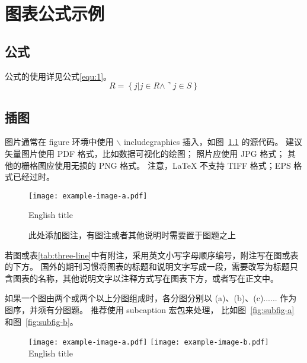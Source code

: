 
\chapter{图表公式示例}
\section{公式}
公式的使用详见公式\eqref{equ:1}。
\begin{equation}
    R = \left\{ j | j \in  R \wedge \urcorner j \in S  \right\}
    \label{equ:1} %
\end{equation}

\section{插图}

图片通常在 figure 环境中使用\cite{dupont1974bone}\cite{jianduju1994}  $\backslash$ includegraphics 插入，如图~\ref{fig:example} 的源代码。
建议矢量图片使用 PDF 格式，比如数据可视化的绘图；
照片应使用 JPG 格式；
其他的栅格图应使用无损的 PNG 格式。
注意，LaTeX 不支持 TIFF 格式；EPS 格式已经过时。

\begin{figure}[h]
	\centering
	\texttt{[image: example-image-a.pdf]}
	\caption*{此处添加图注，有图注或者其他说明时需要置于图题之上}
	 {English title}

	\label{fig:example}
\end{figure}

若图或表\ref{tab:three-line}中有附注，采用英文小写字母顺序编号，附注写在图或表的下方。
国外的期刊习惯将图表的标题和说明文字写成一段，需要改写为标题只含图表的名称，其他说明文字以注释方式写在图表下方，或者写在正文中。

如果一个图由两个或两个以上分图组成时，各分图分别以 (a)、(b)、(c)...... 作为图序，并须有分图题。
推荐使用 subcaption 宏包来处理， 比如图~\ref{fig:subfig-a} 和图~\ref{fig:subfig-b}。



\begin{figure}[h]
	\centering
	{\texttt{[image: example-image-a.pdf]}}
	{\texttt{[image: example-image-b.pdf]}}
	 {English title}

	\label{fig:multi-image}
\end{figure}



